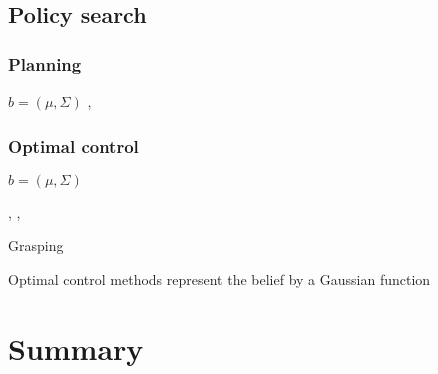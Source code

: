 \cite{belief_compression_2005}
\cite{bs_compression_2010}


\cite{next_best_touch}
\cite{CostalNavigation1999}
\cite{Roy99coastalnavigation}

\subsection{Policy search}

\cite{Pegasus_2000}
\cite{dmp_seq_2012}
\cite{dmp_iros_2011}

\cite{dense_entropy_icra_2014}
\cite{Uncer_reduction_heuristic_2015}
\cite{Sol_POMDP_Policy_space_1998}


\cite{sigma_hull_iros_2013}
\cite{int_motion_planning_2013}  %

\subsubsection{Planning}
$b = (\mu,\Sigma)$
\cite{Quadrator_2008},
\cite{BelRoadMap_2009}

\cite{non_gauss_bel_plan_2012}	%
\cite{active_RSS_07} 	%
\cite{plan_cont_bel_space_2015}
\cite{rob_online_bs_icra_2014}
\cite{bel_roadmap_2009}


\subsubsection{Optimal control}
$b = (\mu,\Sigma)$
 
\cite{plattRSS10} 	%
\cite{Erez10ascalable},
\cite{van_den_Berg_2012}, 
\cite{Platt-RSS-10}

 
Grasping
\cite{u_aware_grasp_ICRA_2015}
\cite{learn_grasp_un_icra_2011}
\cite{seq_traj_replan_iros_2013}
\cite{Li_2015}


\cite{un_water_inspection_icra_2012}


Optimal control methods represent the belief by a Gaussian function 

\cite{Bayesian_explor_exploit_2009}
\cite{Macro_uncertainty_2011}

\section{Summary}




